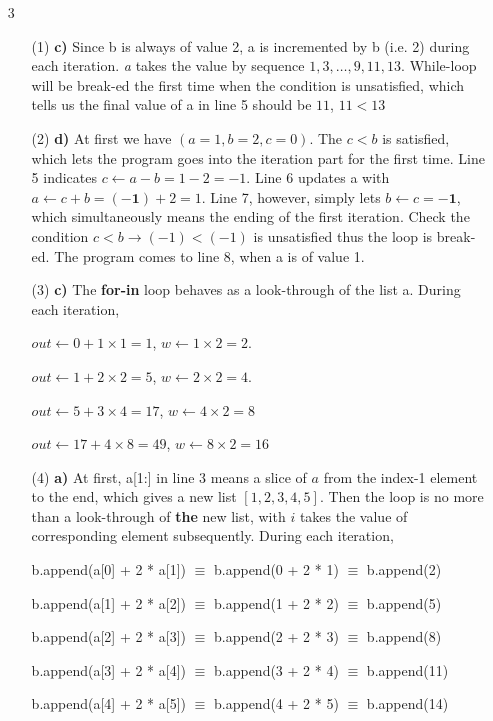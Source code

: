\documentclass[11pt]{amsart}
\begin{document}
\begin{itemize}
\item [3]
\begin{itemize}
\item [(1)] \textbf{c)} Since b is always of value 2, a is incremented by b (i.e. 2) during each iteration. \textit{a} takes the value by sequence $1,3,\hdots,9,11,13$. While-loop will be break-ed the first time when the condition is unsatisfied, which tells us the final value of a in line 5 should be $11$, \textbf{$11 < 13$}
\item [(2)] \textbf{d)} At first we have $(a = 1, b = 2, c = 0)$. The $c < b$ is satisfied, which lets the program goes into the iteration part for the first time. Line 5 indicates $c \gets a - b = 1 - 2 = - 1$. Line 6 updates a with $a \gets c + b = \mathbf{(-1)} + 2 = 1$. Line 7, however, simply lets $b \gets c = \mathbf{-1}$, which simultaneously means the ending of the first iteration. Check the condition $c < b \to (-1) < (-1)$ is unsatisfied thus the loop is break-ed. The program comes to line 8, when a is of value 1.
\item [(3)] \textbf{c)} The \textbf{for-in} loop behaves as a look-through of the list a. 
During each iteration,

 $out \gets 0 + 1 \times 1 = 1$, $w \gets 1 \times 2 = 2$. 
 
 $out \gets 1 + 2 \times 2 = 5$, $w \gets 2 \times 2 = 4$. 
 
 $out \gets 5 + 3 \times 4 = 17$, $w \gets 4 \times 2 = 8$
 
 $out \gets 17 + 4 \times 8 = 49$, $w \gets 8 \times 2 = 16$
 
 \item[(4)] \textbf{a)} At first, a[1:] in line 3 means a slice of $a$ from the index-1 element to the end, which gives a new list $[1,2,3,4,5]$. Then the loop is no more than a look-through of \textbf{the} new list, with $i$ takes the value of corresponding element subsequently.
 During each iteration, 
 
b.append(a[0] + 2 * a[1]) $\equiv$ b.append(0 + 2 * 1)   $\equiv$ b.append(2)

b.append(a[1] + 2 * a[2]) $\equiv$ b.append(1 + 2 * 2)   $\equiv$ b.append(5)

b.append(a[2] + 2 * a[3]) $\equiv$ b.append(2 + 2 * 3)   $\equiv$ b.append(8)

b.append(a[3] + 2 * a[4]) $\equiv$ b.append(3 + 2 * 4)   $\equiv$ b.append(11)

b.append(a[4] + 2 * a[5]) $\equiv$ b.append(4 + 2 * 5)   $\equiv$ b.append(14)



\end{itemize}
\end{itemize}
\end{document}
